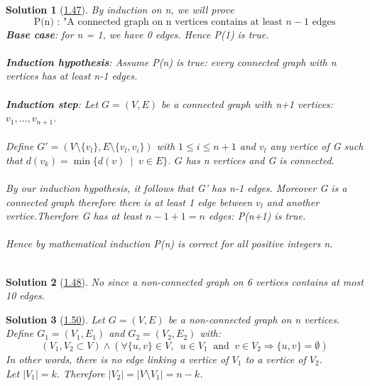 \documentclass[10pt]{report}
\numberwithin{dummy}{section}
\theoremstyle{ocrenumbox}
\newtheorem{definitionTT}{Solution}[]
\theoremstyle{grayman}
\newenvironment{sol}{\begin{sBox}\begin{definitionTT}}{\end{definitionTT}\end{sBox}}
\begin{document}
\begin{sol}[\hypertarget{so147}{\hyperlink{exo147}{1.47}}]
By induction on n, we will prove 
\[ \mbox{P(n) : "A connected graph on n vertices contains at least } n-1 \mbox{ edges} \]
\textbf{Base case}: for n = 1, we have 0 edges. Hence P(1) is true.\\ \\
\textbf{Induction hypothesis}: Assume P(n) is true: every connected graph with n vertices has at least n-1 edges.\\ \\
\textbf{Induction step}: Let $G=(V,E)$ be a connected graph with n+1 vertices: $v_1,\dots,v_{n+1}$.\\ \\
Define $G'=(V\setminus\{v_l\},E\setminus \{v_l,v_i\})$ with $1\leq i \leq n+1$ and $v_l$ any vertice of G such that $d(v_k) = \min \{d(v)\phantom{a} | \phantom{a} v \in E \}$.
$G$ has n vertices and G is connected.\\ \\
By our induction hypothesis, it follows that G' has n-1 edges. Moreover G is a connected graph therefore there is at least 1 edge between $v_l$ and another vertice.Therefore G has at least $n-1+1 = n$ edges: P(n+1) is true.\\ \\
Hence by mathematical induction P(n) is correct for all positive integers n.\\ \\



\end{sol}
\begin{sol}[\hypertarget{so148}{\hyperlink{exo148}{1.48}}]
No since a non-connected graph on 6 vertices contains at most 10 edges.
\end{sol}
\begin{sol}[\hypertarget{so159}{\hyperlink{exo150}{1.50}}]
Let $G=(V,E)$ be a non-connected graph on n vertices.\\Define $G_1=(V_1,E_1)$ and $G_2=(V_2,E_2)$ with:
\[\left(V_1,V_2 \subset V \right) \wedge \left(\forall \{u,v\} \in V,\phantom{a} u \in V_1\phantom{a}\mbox{and}\phantom{a} v \in V_2 \Rightarrow \{u,v\} = \emptyset\right) \]
In other words, there is no edge linking a vertice of $V_1$ to a vertice of $V_2$.\\
Let $\lvert V_1 \rvert = k$. Therefore $\lvert V_2 \rvert = \lvert V \setminus V_1 \rvert = n-k$.
\end{sol}
\end{document}
